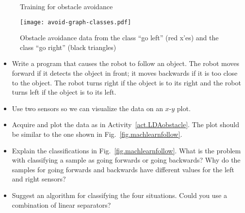 \begin{figure}
\begin{center}
\end{center}
\caption{Training for obstacle avoidance}\label{fig.train-data-avoid}
\end{figure}

\begin{figure}
\begin{center}
\texttt{[image: avoid-graph-classes.pdf]}
\end{center}
\caption{Obstacle avoidance data from the class ``go left'' (red x'es) and the class ``go right'' (black triangles)}\label{fig.machlearnavoid}
\end{figure}

\begin{framed}
\begin{itemize}
\item Write a program that causes the robot to follow an object. The robot moves forward if it detects the object in front; it moves backwards if it is  too close to the object. The robot turns right if the object is to its right and the robot turns left if the object is to its left.
\item Use two sensors so we can visualize the data on an $x$-$y$ plot.
\item Acquire and plot the data as in Activity~\ref{act.LDAobstacle}. The plot should be similar to the one shown in Fig.~\ref{fig.machlearnfollow}.
\item Explain the classifications in Fig.~\ref{fig.machlearnfollow}. What is the problem with classifying a sample as going forwards or going backwards? Why do the samples for going forwards and backwards have different values for the left and right sensors?
\item Suggest an algorithm for classifying the four situations. Could you use a combination of linear separators?
\end{itemize}
\end{framed}

